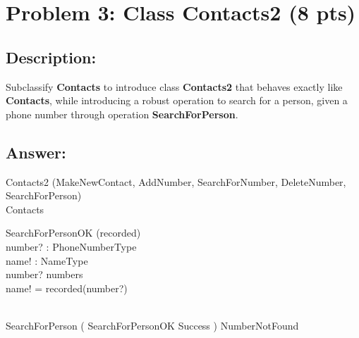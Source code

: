 \newpage
\section{Problem 3: Class Contacts2 (8 pts)}

\subsection{Description:}
Subclassify \textbf{Contacts} to introduce class \textbf{Contacts2} that behaves exactly like \textbf{Contacts},
while introducing a robust operation to search for a person, given a phone number through
operation \textbf{SearchForPerson}.

\subsection{Answer:}

\begin{class}{Contacts2}
\also
\upharpoonright (MakeNewContact, AddNumber, SearchForNumber, DeleteNumber,\\ SearchForPerson) \\
Contacts\\
\begin{op}{SearchForPersonOK}
\Xi (recorded) \\
number? : PhoneNumberType \\
name! : NameType\\
\ST
number? \in numbers\\
name! = recorded(number?)
\end{op}\\
\also
SearchForPerson \sdef ( SearchForPersonOK \land Success ) \oplus NumberNotFound\\
\end{class}
